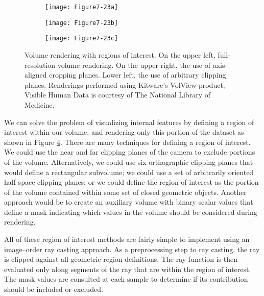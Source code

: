 \begin{figure}[!htb]
	\centering
	\begin{subfigure}{0.48\linewidth}
		\centering
		\texttt{[image: Figure7-23a]}
		\caption*{}\label{fig:Figure7-23a}
	\end{subfigure}
	\hfill
	\begin{subfigure}{0.48\linewidth}
		\centering
		\texttt{[image: Figure7-23b]}
		\captionsetup{justification=centering}
		\caption*{}\label{fig:Figure7-23b}
	\end{subfigure}%
	\hfill
	\medbreak
	\begin{subfigure}{0.48\linewidth}
		\centering
		\texttt{[image: Figure7-23c]}
		\captionsetup{justification=centering}
		\caption*{}\label{fig:Figure7-23c}
	\end{subfigure}%
	\caption{Volume rendering with regions of interest. On the upper left, full-resolution volume rendering. On the upper right, the use of axis-aligned cropping planes. Lower left, the use of arbitrary clipping planes. Renderings performed using Kitware's VolView product; Visible Human Data is courtesy of The National Library of Medicine.}
	\label{fig:Figure7-23}
\end{figure}

We can solve the problem of visualizing internal features by defining a region of interest within our volume, and rendering only this portion of the dataset as shown in Figure \ref{fig:Figure7-23}. There are many techniques for defining a region of interest. We could use the near and far clipping planes of the camera to exclude portions of the volume. Alternatively, we could use six orthographic clipping planes that would define a rectangular subvolume; we could use a set of arbitrarily oriented half-space clipping planes; or we could define the region of interest as the portion of the volume contained within some set of closed geometric objects. Another approach would be to create an auxiliary volume with binary scalar values that define a mask indicating which values in the volume should be considered during rendering.

All of these region of interest methods are fairly simple to implement using an image--order ray casting approach. As a preprocessing step to ray casting, the ray is clipped against all geometric region definitions. The ray function is then evaluated only along segments of the ray that are within the region of interest. The mask values are consulted at each sample to determine if its contribution should be included or excluded.

